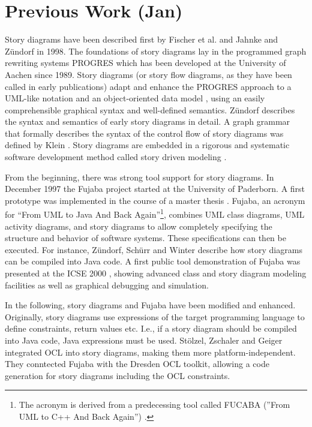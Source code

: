 \section{Previous Work (Jan)}

Story diagrams have been described first by Fischer et al. \cite{FNTZ00} and Jahnke and Z\"{u}ndorf \cite{JZ98} in 1998.
The foundations of story diagrams lay in the programmed graph rewriting systems PROGRES \cite{SWZ95} which has been developed at the University of Aachen since 1989.
Story diagrams (or story flow diagrams, as they have been called in early publications) adapt and enhance the PROGRES approach to a UML-like notation and an object-oriented data model \cite{JZ98}, using an easily comprehensible graphical syntax and well-defined semantics.
Z\"{u}ndorf \cite{Zun01} describes the syntax and semantics of early story diagrams in detail.
A graph grammar that formally describes the syntax of the control flow of story diagrams was defined by Klein \cite{Kle99}.
Story diagrams are embedded in a rigorous and systematic software development method called story driven modeling \cite{Zun01,DGZ04}.

From the beginning, there was strong tool support for story diagrams.
In December 1997 the Fujaba project started at the University of Paderborn.
A first prototype was implemented in the course of a master thesis \cite{FNT98}.
Fujaba, an acronym for ``From UML to Java And Back Again''\footnote{The acronym is derived from a predecessing tool called FUCABA (''From UML to C++ And Back Again'') \cite{JZ97}.}, combines UML class diagrams, UML activity diagrams, and story diagrams to allow completely specifying the structure and behavior of software systems.
These specifications can then be executed.
For instance, Z\"{u}ndorf, Sch\"{u}rr and Winter \cite{ZSW99} describe how story diagrams can be compiled into Java code.
A first public tool demonstration of Fujaba was presented at the ICSE 2000 \cite{NNZ00}, showing advanced class and story diagram modeling facilities as well as graphical debugging and simulation.

In the following, story diagrams and Fujaba have been modified and enhanced.
Originally, story diagrams use expressions of the target programming language to define constraints, return values etc.
I.e., if a story diagram should be compiled into Java code, Java expressions must be used.
St\"{o}lzel, Zschaler and Geiger \cite{SZG07} integrated OCL into story diagrams, making them more platform-independent.
They conntected Fujaba with the Dresden OCL toolkit, allowing a code generation for story diagrams including the OCL constraints.

